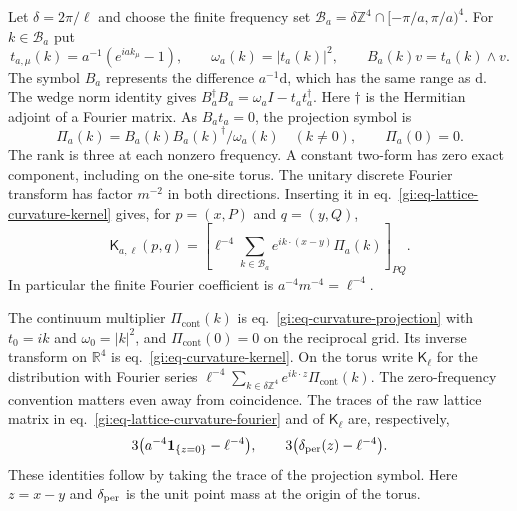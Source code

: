 \documentclass[11pt,letterpaper,reqno]{amsart}
\numberwithin{equation}{section}
\renewcommand{\eqref}[1]{\textup{eq.~\ref{#1}}}
\theoremstyle{definition}
\theoremstyle{remark}
\begin{document}
Let \(\delta=2\pi/\ell\) and choose the finite frequency set
\(\mathcal B_a=\delta\mathbb Z^4\cap[-\pi/a,\pi/a)^4\).
For \(k\in\mathcal B_a\) put
\[
 t_{a,\mu}(k)=a^{-1}(e^{iak_\mu}-1),\qquad
 \omega_a(k)=|t_a(k)|^2,\qquad B_a(k)v=t_a(k)\wedge v.
\]
The symbol \(B_a\) represents the difference \(a^{-1}\mathrm d\),
which has the same range as \(\mathrm d\).
The wedge norm identity gives
\(B_a^\dagger B_a=\omega_a I-t_at_a^\dagger\).
Here \(\dagger\) is the Hermitian adjoint of a Fourier matrix.
As \(B_a t_a=0\), the projection symbol is
\begin{equation}\label{gi:eq-curvature-projection}
    \Pi_a(k)=B_a(k)B_a(k)^\dagger/\omega_a(k)\quad(k\ne0),
                    \qquad \Pi_a(0)=0 .
\end{equation}
The rank is three at each nonzero frequency. A constant
two-form has zero exact component, including on the one-site
torus. The unitary discrete Fourier transform has factor
\(m^{-2}\) in both directions. Inserting it in
\eqref{gi:eq-lattice-curvature-kernel} gives, for \(p=(x,P)\)
and \(q=(y,Q)\),
\begin{equation}\label{gi:eq-lattice-curvature-fourier}
  \mathsf K_{a,\ell}(p,q)
  =\left[\ell^{-4}\sum_{k\in\mathcal B_a}
                   e^{ik\cdot(x-y)}\Pi_a(k)\right]_{PQ}.
\end{equation}
In particular the finite Fourier coefficient is
\(a^{-4}m^{-4}=\ell^{-4}\).

The continuum multiplier \(\Pi_{\mathrm{cont}}(k)\) is
\eqref{gi:eq-curvature-projection} with \(t_0=ik\) and
\(\omega_0=|k|^2\), and \(\Pi_{\mathrm{cont}}(0)=0\) on the
reciprocal grid.
Its inverse transform on \(\mathbb R^4\) is
\eqref{gi:eq-curvature-kernel}.
On the torus write \(\mathsf K_\ell\) for the distribution with
Fourier series
\(\ell^{-4}\sum_{k\in\delta\mathbb Z^4}
e^{ik\cdot z}\Pi_{\mathrm{cont}}(k)\).
The zero-frequency convention matters even away from
coincidence. The traces of the raw lattice matrix in
\eqref{gi:eq-lattice-curvature-fourier} and of \(\mathsf K_\ell\)
are, respectively,
\[
  3\bigl(a^{-4}\mathbf 1_{\{z=0\}}-\ell^{-4}\bigr),
                 \qquad 3\bigl(\delta_{\rm per}(z)-\ell^{-4}\bigr).
\]
These identities follow by taking the trace of the projection
symbol. Here \(z=x-y\) and \(\delta_{\rm per}\) is the unit point
mass at the origin of the torus.
\end{document}
